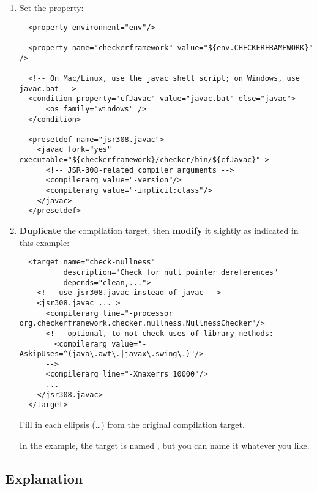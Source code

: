 \begin{enumerate}
\item
Set the  property:

\begin{smaller}
\begin{Verbatim}
  <property environment="env"/>

  <property name="checkerframework" value="${env.CHECKERFRAMEWORK}" />

  <!-- On Mac/Linux, use the javac shell script; on Windows, use javac.bat -->
  <condition property="cfJavac" value="javac.bat" else="javac">
      <os family="windows" />
  </condition>

  <presetdef name="jsr308.javac">
    <javac fork="yes" executable="${checkerframework}/checker/bin/${cfJavac}" >
      <!-- JSR-308-related compiler arguments -->
      <compilerarg value="-version"/>
      <compilerarg value="-implicit:class"/>
    </javac>
  </presetdef>
\end{Verbatim}
\end{smaller}

\item \textbf{Duplicate} the compilation target, then \textbf{modify} it slightly as
indicated in this example:

\begin{smaller}
\begin{Verbatim}
  <target name="check-nullness"
          description="Check for null pointer dereferences"
          depends="clean,...">
    <!-- use jsr308.javac instead of javac -->
    <jsr308.javac ... >
      <compilerarg line="-processor org.checkerframework.checker.nullness.NullnessChecker"/>
      <!-- optional, to not check uses of library methods:
        <compilerarg value="-AskipUses=^(java\.awt\.|javax\.swing\.)"/>
      -->
      <compilerarg line="-Xmaxerrs 10000"/>
      ...
    </jsr308.javac>
  </target>
\end{Verbatim}
\end{smaller}

Fill in each ellipsis (\ldots) from the original compilation target.

In the example, the target is named , but you can
name it whatever you like.
\end{enumerate}

\subsection{Explanation\label{ant-task-explanation}}

